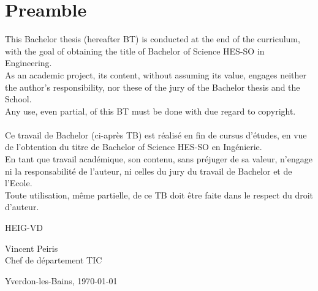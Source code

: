 \hspace{0pt}
\vfill
\section{Preamble}

This Bachelor thesis (hereafter BT) is conducted at the end of the curriculum, with the goal of obtaining the title of Bachelor of Science HES-SO in Engineering.\\

As an academic project, its content, without assuming its value, engages neither the author's responsibility, nor these of the jury of the Bachelor thesis and the School.\\

Any use, even partial, of this BT must be done with due regard to copyright.\\\\

Ce travail de Bachelor (ci-après TB) est réalisé en fin de cursus d’études, en vue de l'obtention du titre de Bachelor of Science HES-SO en Ingénierie. \\

En tant que travail académique, son contenu, sans préjuger de sa valeur, n'engage ni la responsabilité de l'auteur, ni celles du jury du travail de Bachelor et de l'Ecole. \\

Toute utilisation, même partielle, de ce TB doit être faite dans le respect du droit d’auteur. \\

\begin{flushright}
    \begin{minipage}{7cm}
        \vspace{2cm}
        HEIG-VD \\

        \vspace{2cm}

        Vincent Peiris\\
        Chef de département TIC
    \end{minipage}\hfill
\end{flushright}

\vspace{2.5cm}

Yverdon-les-Bains, \today
\vfill
\hspace{0pt}
